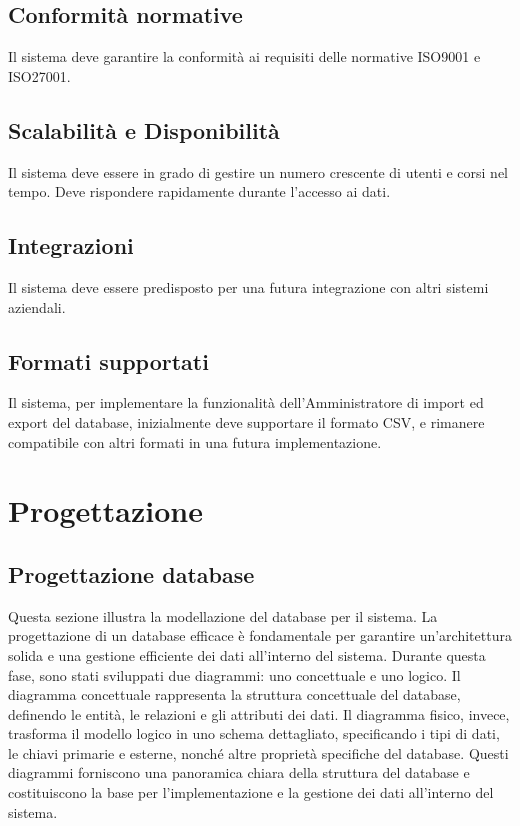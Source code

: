 \subsection{Conformità normative}
Il sistema deve garantire la conformità ai requisiti delle normative ISO9001 e ISO27001.
\subsection{Scalabilità e Disponibilità}
Il sistema deve essere in grado di gestire un numero crescente di utenti e corsi nel tempo. Deve rispondere rapidamente durante l'accesso ai dati. 
\subsection{Integrazioni}
Il sistema deve essere predisposto per una futura integrazione con altri sistemi aziendali.
\subsection{Formati supportati}
Il sistema, per implementare la funzionalità dell’Amministratore di import ed export del database, inizialmente deve supportare il formato CSV, e rimanere compatibile con altri formati in una futura implementazione.

\section{Progettazione}

\subsection{Progettazione database}
Questa sezione illustra la modellazione del database per il sistema. La progettazione di un database efficace è fondamentale per garantire un'architettura solida e una gestione efficiente dei dati all'interno del sistema. Durante questa fase, sono stati sviluppati due diagrammi: uno concettuale e uno logico. Il diagramma concettuale rappresenta la struttura concettuale del database, definendo le entità, le relazioni e gli attributi dei dati. Il diagramma fisico, invece, trasforma il modello logico in uno schema dettagliato, specificando i tipi di dati, le chiavi primarie e esterne, nonché altre proprietà specifiche del database. Questi diagrammi forniscono una panoramica chiara della struttura del database e costituiscono la base per l'implementazione e la gestione dei dati all'interno del sistema.

